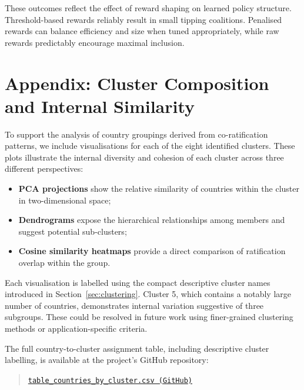 \documentclass[11pt]{article}
\begin{document}
These outcomes reflect the effect of reward shaping on learned policy structure. Threshold-based rewards reliably result in small tipping coalitions. Penalised rewards can balance efficiency and size when tuned appropriately, while raw rewards predictably encourage maximal inclusion.


\section*{Appendix: Cluster Composition and Internal Similarity}
\label{app:cluster_visuals}

To support the analysis of country groupings derived from co-ratification patterns, we include visualisations for each of the eight identified clusters. These plots illustrate the internal diversity and cohesion of each cluster across three different perspectives:

\begin{itemize}
	\item \textbf{PCA projections} show the relative similarity of countries within the cluster in two-dimensional space;
	\item \textbf{Dendrograms} expose the hierarchical relationships among members and suggest potential sub-clusters;
	\item \textbf{Cosine similarity heatmaps} provide a direct comparison of ratification overlap within the group.
\end{itemize}

Each visualisation is labelled using the compact descriptive cluster names introduced in Section~\ref{sec:clustering}. Cluster 5, which contains a notably large number of countries, demonstrates internal variation suggestive of three subgroups. These could be resolved in future work using finer-grained clustering methods or application-specific criteria.

\vspace{0.5em}

The full country-to-cluster assignment table, including descriptive cluster labelling, is available at the project's GitHub repository:

\begin{quote}
	\href{https://github.com/its-not-rocket-science/tensor-based-game-theory-identifying-critical-coalitions-climate-change-negotiations/blob/main/outputs/table_countries_by_cluster.csv}{\texttt{table\_countries\_by\_cluster.csv (GitHub)}}
\end{quote}
\end{document}
